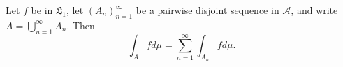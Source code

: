 Let $f$ be in $\mathfrak{L}_1$, let $(A_n)_{n=1}^{\infty}$ be a pairwise disjoint sequence in $\mathcal{A}$, and write $A = \bigcup_{n=1}^{\infty} A_n$. Then $$\int_A f d\mu = \sum_{n=1}^{\infty} \int_{A_n} f d\mu.$$
